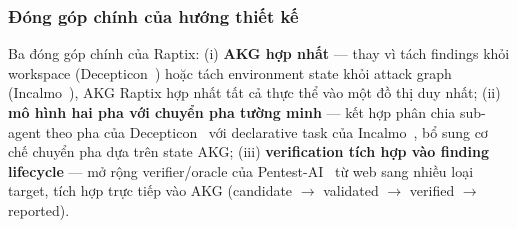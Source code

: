 \subsubsection*{Đóng góp chính của hướng thiết kế}

Ba đóng góp chính của Raptix: (i) \textbf{AKG hợp nhất} — thay vì tách findings khỏi workspace (Decepticon~\cite{decepticon}) hoặc tách environment state khỏi attack graph (Incalmo~\cite{incalmo}), AKG Raptix hợp nhất tất cả thực thể vào một đồ thị duy nhất; (ii) \textbf{mô hình hai pha với chuyển pha tường minh} — kết hợp phân chia sub-agent theo pha của Decepticon~\cite{decepticon} với declarative task của Incalmo~\cite{incalmo}, bổ sung cơ chế chuyển pha dựa trên state AKG; (iii) \textbf{verification tích hợp vào finding lifecycle} — mở rộng verifier/oracle của Pentest-AI~\cite{pentestai} từ web sang nhiều loại target, tích hợp trực tiếp vào AKG (candidate $\rightarrow$ validated $\rightarrow$ verified $\rightarrow$ reported).


